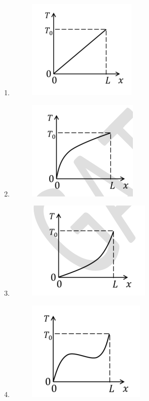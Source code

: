 \documentclass[journal]{IEEEtran}
\begin{document}
\begin{enumerate}[leftmargin=0pt]
\vspace{2mm}
\begin{enumerate}
\item
\begin{figure}[h]
\includegraphics[width=0.24\columnwidth]{Figs/image (64).png}
\caption*{}
\label{fig:a}
\end{figure}
\item
\begin{figure}[h]
\includegraphics[width=0.24\columnwidth]{Figs/image (65).png}
\caption*{}
\label{fig:b}
\end{figure}
\item
\begin{figure}[h]
\includegraphics[width=0.24\columnwidth]{Figs/image (66).png}
\caption*{}
\label{fig:c}
\end{figure}
\item
\begin{figure}[h]
\includegraphics[width=0.24\columnwidth]{Figs/image (67).png}
\caption*{}
\label{fig:d}
\end{figure}
\end{enumerate}

\hfill{}

\vspace{4mm}


\end{enumerate}
\end{document}
